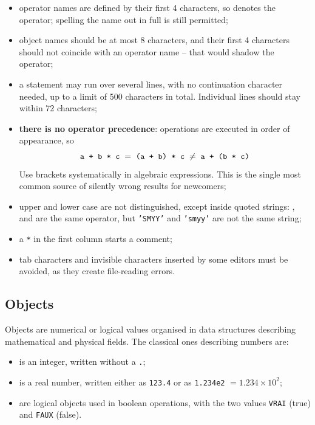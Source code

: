 \begin{itemize}
\item operator names are defined by their first 4 characters, so 
  denotes the  operator; spelling the name out in full is
  still permitted;
\item object names should be at most 8 characters, and their first 4
  characters should not coincide with an operator name -- that would shadow
  the operator;
\item a statement may run over several lines, with no continuation character
  needed, up to a limit of 500 characters in total. Individual lines should
  stay within 72 characters;
\item \textbf{there is no operator precedence}: operations are executed in
  order of appearance, so
  \[ \texttt{a + b * c} \;=\; \texttt{(a + b) * c} \;\neq\; \texttt{a + (b * c)} \]
  Use brackets systematically in algebraic expressions. This is the single
  most common source of silently wrong results for newcomers;
\item upper and lower case are not distinguished, except inside quoted
  strings: ,  and  are the same operator, but
  \texttt{'SMYY'} and \texttt{'smyy'} are not the same string;
\item a \texttt{*} in the first column starts a comment;
\item tab characters and invisible characters inserted by some editors must be
  avoided, as they create file-reading errors.
\end{itemize}

\subsection*{Objects}

Objects are numerical or logical values organised in data structures
describing mathematical and physical fields. The classical ones describing
numbers are:

\begin{itemize}
\item {}  is an integer, written without a
  \texttt{.};
\item {}  is a real number, written
  either as \texttt{123.4} or as \texttt{1.234e2} $=1.234\times10^{2}$;
\item {}  are logical objects used in
  boolean operations, with the two values \texttt{VRAI} (true) and
  \texttt{FAUX} (false).
\end{itemize}

